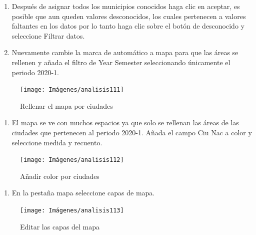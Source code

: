 \documentclass[
]{book}
\providecommand{\tightlist}{%
  \setlength{\itemsep}{0pt}\setlength{\parskip}{0pt}}
\begin{document}
\begin{enumerate}
\def\labelenumi{\arabic{enumi}.}
\setcounter{enumi}{2}
\item
  Después de asignar todos los municipios conocidos haga clic en aceptar, es posible que aun queden valores desconocidos, los cuales pertenecen a valores faltantes en los datos por lo tanto haga clic sobre el botón de desconocido y seleccione Filtrar datos.
\item
  Nuevamente cambie la marca de automático a mapa para que las áreas se rellenen y añada el filtro de Year Semester seleccionando únicamente el periodo 2020-1.
\end{enumerate}

\begin{figure}

{\centering \texttt{[image: Imágenes/analisis111]} 

}

\caption{Rellenar el mapa por ciudades}\label{fig:paso4mapeomunicipios-fig}
\end{figure}

\begin{enumerate}
\def\labelenumi{\arabic{enumi}.}
\setcounter{enumi}{4}
\tightlist
\item
  El mapa se ve con muchos espacios ya que solo se rellenan las áreas de las ciudades que pertenecen al periodo 2020-1. Añada el campo Ciu Nac a color y seleccione medida y recuento.
\end{enumerate}

\begin{figure}

{\centering \texttt{[image: Imágenes/analisis112]} 

}

\caption{Añadir color por ciudades}\label{fig:paso5mapeomunicipios-fig}
\end{figure}

\begin{enumerate}
\def\labelenumi{\arabic{enumi}.}
\setcounter{enumi}{5}
\tightlist
\item
  En la pestaña mapa seleccione capas de mapa.
\end{enumerate}

\begin{figure}

{\centering \texttt{[image: Imágenes/analisis113]} 

}

\caption{Editar las capas del mapa}\label{fig:paso6mapeomunicipios-fig}
\end{figure}
\end{document}
